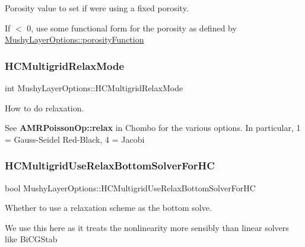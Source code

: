 Porosity value to set if we\textquotesingle{}re using a fixed porosity. 

If $<$ 0, use some functional form for the porosity as defined by \hyperlink{struct_mushy_layer_options_aeb47e7ed2e0486243c51c1fd815b2ee1}{Mushy\+Layer\+Options\+::porosity\+Function} \mbox{\label{struct_mushy_layer_options_a8f5654eec8b54b68574513aba5d629cc}} 
\subsubsection{\texorpdfstring{H\+C\+Multigrid\+Relax\+Mode}{HCMultigridRelaxMode}}
{\footnotesize\ttfamily int Mushy\+Layer\+Options\+::\+H\+C\+Multigrid\+Relax\+Mode}



How to do relaxation. 

See \textbf{ A\+M\+R\+Poisson\+Op\+::relax} in Chombo for the various options. In particular, 1 = Gauss-\/\+Seidel Red-\/\+Black, 4 = Jacobi \mbox{\label{struct_mushy_layer_options_ab4b570de637aab8151bfb5b081768839}} 
\subsubsection{\texorpdfstring{H\+C\+Multigrid\+Use\+Relax\+Bottom\+Solver\+For\+HC}{HCMultigridUseRelaxBottomSolverForHC}}
{\footnotesize\ttfamily bool Mushy\+Layer\+Options\+::\+H\+C\+Multigrid\+Use\+Relax\+Bottom\+Solver\+For\+HC}



Whether to use a relaxation scheme as the bottom solve. 

We use this here as it treats the nonlinearity more sensibly than linear solvers like Bi\+C\+G\+Stab \mbox{\label{struct_mushy_layer_options_a4bfcfa9308587a2c1fcce378eaecec1b}} 
